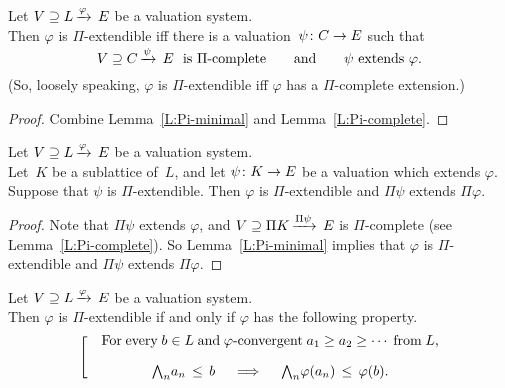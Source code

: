 %
%
\begin{cor}
Let $V \supseteq L\,\smash{\xrightarrow{\varphi}\,E}$ be a valuation system.\\
Then $\varphi$ is $\Pi$-extendible
iff 
there is a valuation~$\psi\colon C\rightarrow E$
such that 
\begin{equation*}
V \supseteq C\,\smash{\xrightarrow{\psi}\,E}\text{ \ is $\Pi$-complete}
\qquad\text{and}\qquad
\psi\text{ extends }\varphi.
\end{equation*}
(So, loosely speaking,
$\varphi$ is $\Pi$-extendible
iff $\varphi$ has a $\Pi$-complete extension.)
\end{cor}
\begin{proof}
Combine Lemma~\ref{L:Pi-minimal}
and Lemma~\ref{L:Pi-complete}.
\end{proof}
%
%
\begin{lem}
\label{L:Pi-monotonous}
Let $V \supseteq L\,\smash{\xrightarrow{\varphi}\,E}$ be a valuation system.\\
Let~$K$ be a sublattice of~$L$,
and let $\psi\colon K\rightarrow E$ be a valuation
which extends $\varphi$.\\
Suppose that $\psi$ is $\Pi$-extendible.
Then $\varphi$ is $\Pi$-extendible
and  $\Pi\psi$ extends $\Pi\varphi$.
\end{lem}
\begin{proof}
Note that $\Pi\psi$ extends $\varphi$,
and $V \supseteq \Pi K\,\smash{\xrightarrow{\Pi \psi}\,E}$
is $\Pi$-complete (see Lemma~\ref{L:Pi-complete}).
So Lemma~\ref{L:Pi-minimal}
implies that
$\varphi$ is $\Pi$-extendible
and $\Pi\psi$ extends $\Pi\varphi$.
\end{proof}
%
%
\begin{lem}
\label{L:Pi-continuity}
Let $V \supseteq L\,\smash{\xrightarrow{\varphi}\,E}$ be a valuation system.\\
Then $\varphi$ is $\Pi$-extendible
if and only if  $\varphi$
has the following property.
\begin{equation}
\label{eq:Pi-cont}
\left[ \quad
\begin{minipage}{.7\columnwidth}
For every $b\in L$ and $\varphi$-convergent
 $a_1 \geq a_2 \geq \dotsb$ from~$L$,
\begin{equation*}
\bw_n a_n \,\leq\, b
\quad\implies\quad
\bw_n \varphi (a_n) \,\leq\, \varphi(b).
\end{equation*}
\end{minipage}
\right.
\end{equation}
\end{lem}
